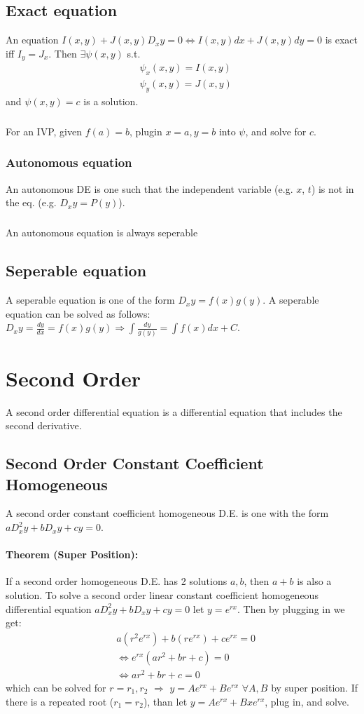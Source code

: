 \documentclass{article}
\begin{document}
\subsection{Exact equation}
An equation $I(x,y)+J(x,y)D_x y=0 \Leftrightarrow I(x,y)dx+J(x,y)dy=0$ is exact iff $I_y=J_x$.  Then $\exists \psi (x,y)$ s.t.
\[
\begin{aligned}
	& \psi _x (x,y)=I(x,y) \\
	& \psi _y (x,y)=J(x,y) 
\end{aligned}
\]
and $\psi (x,y)=c$ is a solution.
\subparagraph{}
For an IVP, given $f(a)=b$, plugin $x=a,y=b$ into $\psi$, and solve for $c$.
\subsubsection{Autonomous equation}
An autonomous DE is one such that the independent variable (e.g. $x$, $t$) is not in the eq. (e.g. $D_x y=P(y)$).
\subparagraph{}
An autonomous equation is always seperable

\subsection{Seperable equation}
A seperable equation is one of the form $D_x y = f(x)g(y)$.  A seperable equation can be solved as follows: $D_x y= \frac{dy}{dx} = f(x)g(y) \Rightarrow \int \frac{dy}{g(y)} = \int f(x)dx + C $.

\section{Second Order}
A second order differential equation is a differential equation that includes the second derivative.
\subsection{Second Order Constant Coefficient Homogeneous}
A second order constant coefficient homogeneous D.E. is one with the form $a D_x^2 y + b D_x y + cy=0$.
\paragraph{Theorem (Super Position):}
If a second order homogeneous D.E. has 2 solutions $a,b$, then $a+b$ is also a solution.
\newline\newline
To solve a second order linear constant coefficient homogeneous differential equation $a D_x^2 y + b D_x y + cy=0$ let $y=e^{rx}$.  Then by plugging in we get:
\[
\begin{aligned}
	& a(r^2e^{rx}) + b(re^{rx}) + ce^{rx} = 0 \\
	& \Leftrightarrow e^{rx}(ar^2 + br + c) = 0 \\
	& \Leftrightarrow ar^2 + br + c=0
\end{aligned}
\]
which can be solved for $r=r_1,r_2$ $\Rightarrow$ $y=Ae^{rx} + Be^{rx}$ $\forall A,B$ by super position.  If there is a repeated root ($r_1=r_2$), than let $y=Ae^{rx}+Bxe^{rx}$, plug in, and solve.
\end{document}

